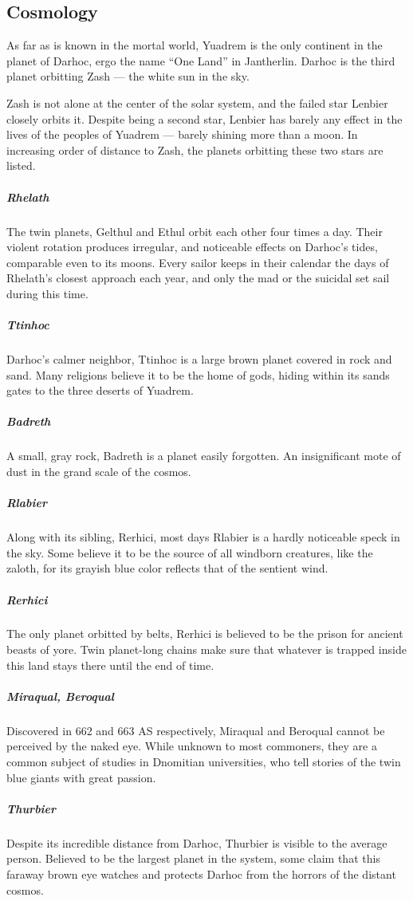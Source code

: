 \subsection*{Cosmology}
As far as is known in the mortal world, Yuadrem is the only continent in the planet of Darhoc, ergo the name ``One Land'' in Jantherlin.
Darhoc is the third planet orbitting Zash --- the white sun in the sky.

Zash is not alone at the center of the solar system, and the failed star Lenbier closely orbits it.
Despite being a second star, Lenbier has barely any effect in the lives of the peoples of Yuadrem --- barely shining more than a moon.
In increasing order of distance to Zash, the planets orbitting these two stars are listed.

\subparagraph{Rhelath} The twin planets, Gelthul and Ethul orbit each other four times a day.
Their violent rotation produces irregular, and noticeable effects on Darhoc's tides, comparable even to its moons.
Every sailor keeps in their calendar the days of Rhelath's closest approach each year, and only the mad or the suicidal set sail during this time.

\subparagraph{Ttinhoc} Darhoc's calmer neighbor, Ttinhoc is a large brown planet covered in rock and sand.
Many religions believe it to be the home of gods, hiding within its sands gates to the three deserts of Yuadrem.

\subparagraph{Badreth} A small, gray rock, Badreth is a planet easily forgotten.
An insignificant mote of dust in the grand scale of the cosmos.

\subparagraph{Rlabier} Along with its sibling, Rerhici, most days Rlabier is a hardly noticeable speck in the sky.
Some believe it to be the source of all windborn creatures, like the zaloth, for its grayish blue color reflects that of the sentient wind.

\subparagraph{Rerhici} The only planet orbitted by belts, Rerhici is believed to be the prison for ancient beasts of yore.
Twin planet-long chains make sure that whatever is trapped inside this land stays there until the end of time.

\subparagraph{Miraqual, Beroqual} Discovered in 662 and 663 AS respectively, Miraqual and Beroqual cannot be perceived by the naked eye.
While unknown to most commoners, they are a common subject of studies in Dnomitian universities, who tell stories of the twin blue giants with great passion.

\subparagraph{Thurbier} Despite its incredible distance from Darhoc, Thurbier is visible to the average person.
Believed to be the largest planet in the system, some claim that this faraway brown eye watches and protects Darhoc from the horrors of the distant cosmos.
